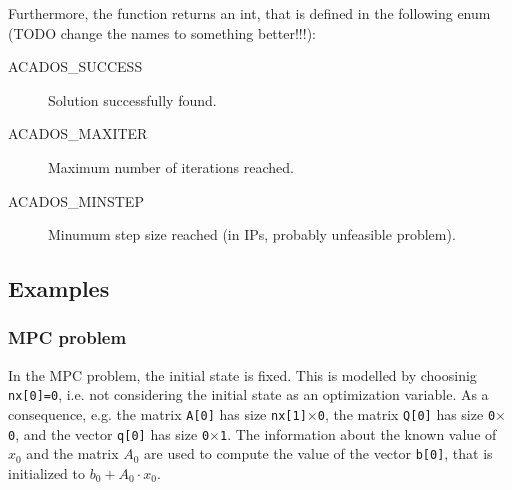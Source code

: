 \documentclass{report}
\begin{document}
Furthermore, the function returns an int, that is defined in the following enum (TODO change the names to something better!!!):
\begin{description}
\item[ACADOS\_SUCCESS] Solution successfully found.
\item[ACADOS\_MAXITER] Maximum number of iterations reached.
\item[ACADOS\_MINSTEP] Minumum step size reached (in IPs, probably unfeasible problem).
\end{description}

\subsection{Examples}

\subsubsection{MPC problem}

In the MPC problem, the initial state is fixed.
This is modelled by choosinig {\tt nx[0]=0}, i.e. not considering the initial state as an optimization variable.
As a consequence, e.g. the matrix {\tt A[0]} has size {\tt nx[1]$\times$0}, the matrix {\tt Q[0]} has size {\tt 0$\times$0}, and the vector {\tt q[0]} has size {\tt 0$\times$1}.
The information about the known value of $x_0$ and the matrix $A_0$ are used to compute the value of the vector {\tt b[0]}, that is initialized to $b_0 + A_0 \cdot x_0$.
\end{document}
